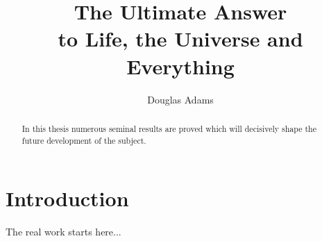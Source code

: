 \documentclass[11pt, twoside]{report}
\title{The Ultimate Answer\\to Life, the Universe and Everything}
\author{Douglas Adams}
\begin{document}
\maketitle

\begin{abstract}
In this thesis numerous seminal results are proved which will
decisively shape the future development of the subject.
\end{abstract}

\chapter{Introduction}

The real work starts here...

\lipsum
\end{document}
